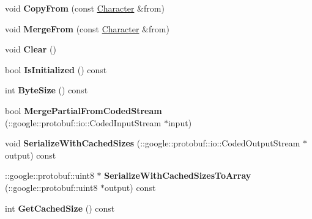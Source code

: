 \begin{DoxyCompactItemize}
\item 
\hypertarget{classproto_1_1_character_add0afd0f841d005acea8326ca2028d90}{}void {\bfseries Copy\+From} (const \hyperlink{classproto_1_1_character}{Character} \&from)\label{classproto_1_1_character_add0afd0f841d005acea8326ca2028d90}

\item 
\hypertarget{classproto_1_1_character_adcf70ea964c51f2608063282baeaa607}{}void {\bfseries Merge\+From} (const \hyperlink{classproto_1_1_character}{Character} \&from)\label{classproto_1_1_character_adcf70ea964c51f2608063282baeaa607}

\item 
\hypertarget{classproto_1_1_character_a42a81f720f0dc1c2e5f0ac1c03ce3251}{}void {\bfseries Clear} ()\label{classproto_1_1_character_a42a81f720f0dc1c2e5f0ac1c03ce3251}

\item 
\hypertarget{classproto_1_1_character_a99242fb29ccace1bd0e21f3a79c954fb}{}bool {\bfseries Is\+Initialized} () const \label{classproto_1_1_character_a99242fb29ccace1bd0e21f3a79c954fb}

\item 
\hypertarget{classproto_1_1_character_af8c367cdffe969e07ad8917b5a107545}{}int {\bfseries Byte\+Size} () const \label{classproto_1_1_character_af8c367cdffe969e07ad8917b5a107545}

\item 
\hypertarget{classproto_1_1_character_a9a96e8b83784508722e34b21172c7c57}{}bool {\bfseries Merge\+Partial\+From\+Coded\+Stream} (\+::google\+::protobuf\+::io\+::\+Coded\+Input\+Stream $\ast$input)\label{classproto_1_1_character_a9a96e8b83784508722e34b21172c7c57}

\item 
\hypertarget{classproto_1_1_character_a922061bd15e72f5289a3d08f0fee7002}{}void {\bfseries Serialize\+With\+Cached\+Sizes} (\+::google\+::protobuf\+::io\+::\+Coded\+Output\+Stream $\ast$output) const \label{classproto_1_1_character_a922061bd15e72f5289a3d08f0fee7002}

\item 
\hypertarget{classproto_1_1_character_a0d5473252d5df1e2093474324c05f1e3}{}\+::google\+::protobuf\+::uint8 $\ast$ {\bfseries Serialize\+With\+Cached\+Sizes\+To\+Array} (\+::google\+::protobuf\+::uint8 $\ast$output) const \label{classproto_1_1_character_a0d5473252d5df1e2093474324c05f1e3}

\item 
\hypertarget{classproto_1_1_character_a86d98fbf393ee54aa17389a9dc1bf282}{}int {\bfseries Get\+Cached\+Size} () const \label{classproto_1_1_character_a86d98fbf393ee54aa17389a9dc1bf282}


\end{DoxyCompactItemize}
